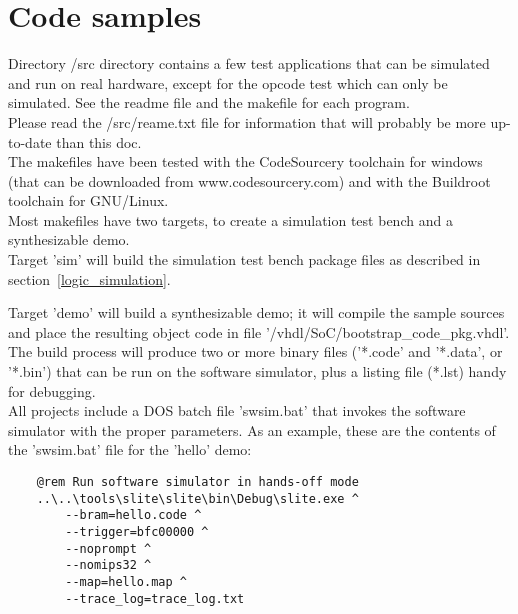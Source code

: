 \chapter{Code samples}
\label{samples}

    Directory /src directory contains a few test applications that can be 
    simulated and run on real hardware, except for the opcode test which can 
    only be simulated. See the readme file and the makefile for each program.\\

    Please read the /src/reame.txt file for information that will probably be
    more up-to-date than this doc.\\
    
    The makefiles have been tested with the CodeSourcery toolchain for windows 
    (that can be downloaded from www.codesourcery.com) and with the Buildroot 
    toolchain for GNU/Linux.\\

    Most makefiles have two targets, to create a simulation test bench and a
    synthesizable demo.\\

    Target 'sim' will build the simulation test bench package files as described 
    in section~\ref{logic_simulation}.
    
    Target 'demo' will build a synthesizable demo; it will compile the sample
    sources and place the resulting object code in file 
    '/vhdl/SoC/bootstrap\_code\_pkg.vhdl'.\\
    
    The build process will produce two or more binary files ('*.code' and 
    '*.data', or '*.bin') that can be run on the software simulator, plus a 
    listing file (*.lst) handy for debugging.\\
    
    All projects include a DOS batch file 'swsim.bat' that invokes the 
    software simulator with the proper parameters. As an example, these are the 
    contents of the 'swsim.bat' file for the 'hello' demo:
    
    \begin{verbatim}
    @rem Run software simulator in hands-off mode
    ..\..\tools\slite\slite\bin\Debug\slite.exe ^
        --bram=hello.code ^
        --trigger=bfc00000 ^
        --noprompt ^
        --nomips32 ^
        --map=hello.map ^
        --trace_log=trace_log.txt
    \end{verbatim}\\

